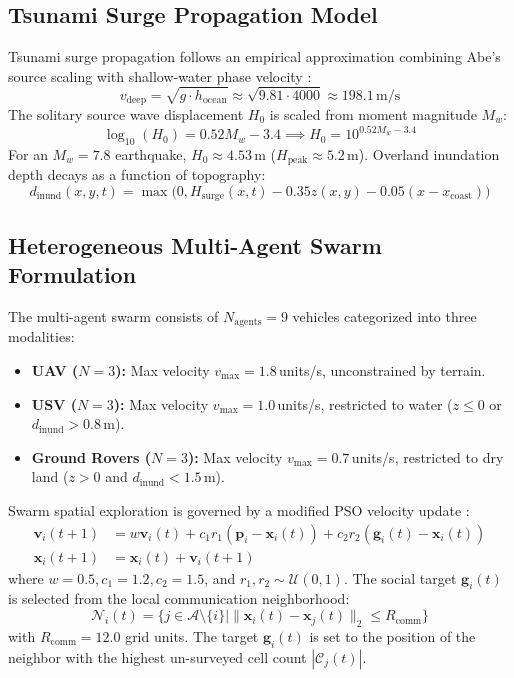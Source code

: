\documentclass[conference]{IEEEtran}
\begin{document}
\subsection{Tsunami Surge Propagation Model}
Tsunami surge propagation follows an empirical approximation combining Abe's source scaling with shallow-water phase velocity \cite{abe1979}:
\begin{equation}
v_{\text{deep}} = \sqrt{g \cdot h_{\text{ocean}}} \approx \sqrt{9.81 \cdot 4000} \approx 198.1\,\text{m/s}
\end{equation}
The solitary source wave displacement $H_0$ is scaled from moment magnitude $M_w$:
\begin{equation}
\log_{10}(H_0) = 0.52 M_w - 3.4 \implies H_0 = 10^{0.52 M_w - 3.4}
\end{equation}
For an $M_w = 7.8$ earthquake, $H_0 \approx 4.53$\,m ($H_{\text{peak}} \approx 5.2$\,m). Overland inundation depth decays as a function of topography:
\begin{equation}
d_{\text{inund}}(x, y, t) = \max\Big(0, H_{\text{surge}}(x, t) - 0.35 z(x, y) - 0.05 (x - x_{\text{coast}})\Big)
\end{equation}

\subsection{Heterogeneous Multi-Agent Swarm Formulation}
The multi-agent swarm consists of $N_{\text{agents}} = 9$ vehicles categorized into three modalities:
\begin{itemize}
    \item \textbf{UAV ($N=3$):} Max velocity $v_{\max} = 1.8$\,units/s, unconstrained by terrain.
    \item \textbf{USV ($N=3$):} Max velocity $v_{\max} = 1.0$\,units/s, restricted to water ($z \le 0$ or $d_{\text{inund}} > 0.8$\,m).
    \item \textbf{Ground Rovers ($N=3$):} Max velocity $v_{\max} = 0.7$\,units/s, restricted to dry land ($z > 0$ and $d_{\text{inund}} < 1.5$\,m).
\end{itemize}

Swarm spatial exploration is governed by a modified PSO velocity update \cite{kennedy1995}:
\begin{align}
\mathbf{v}_i(t+1) &= w \mathbf{v}_i(t) + c_1 r_1 (\mathbf{p}_i - \mathbf{x}_i(t)) + c_2 r_2 (\mathbf{g}_i(t) - \mathbf{x}_i(t)) \\
\mathbf{x}_i(t+1) &= \mathbf{x}_i(t) + \mathbf{v}_i(t+1)
\end{align}
where $w = 0.5, c_1 = 1.2, c_2 = 1.5$, and $r_1, r_2 \sim \mathcal{U}(0, 1)$. The social target $\mathbf{g}_i(t)$ is selected from the local communication neighborhood:
\begin{equation}
\mathcal{N}_i(t) = \{j \in \mathcal{A} \setminus \{i\} \mid \|\mathbf{x}_i(t) - \mathbf{x}_j(t)\|_2 \le R_{\text{comm}}\}
\end{equation}
with $R_{\text{comm}} = 12.0$ grid units. The target $\mathbf{g}_i(t)$ is set to the position of the neighbor with the highest un-surveyed cell count $|\mathcal{C}_j(t)|$.
\end{document}
